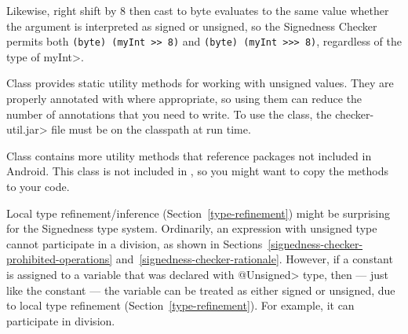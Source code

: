 Likewise, right shift by 8 then cast to byte evaluates to the
same value whether the argument is interpreted as signed or unsigned, so
the Signedness Checker permits both \verb|(byte) (myInt >> 8)| and
\verb|(byte) (myInt >>> 8)|, regardless of the type of \<myInt>.






Class  provides static
utility methods for working with unsigned values.  They are
properly annotated with 
where appropriate, so using them can reduce the number of annotations that
you need to write.
To use the  class, the
\<checker-util.jar> file must be on the classpath at run time.

Class  contains more utility
methods that reference packages not included in Android.  This class is not
included in , so you might want to copy the methods to your code.



Local type refinement/inference (Section~\ref{type-refinement}) might be
surprising for the Signedness type system.  Ordinarily, an expression with
unsigned type cannot participate in a division, as shown in
Sections~\ref{signedness-checker-prohibited-operations}
and~\ref{signedness-checker-rationale}.  However, if a constant is assigned
to a variable that was declared with \<@Unsigned> type, then --- just like
the constant --- the variable can be treated as either signed or unsigned,
due to local type refinement (Section~\ref{type-refinement}).
For example, it can participate in division.

